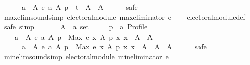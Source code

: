\begin{isabellebody}
\ \ \ \ \ \ {\isacharbraceleft}{\kern0pt}a\ {\isasymin}\ A{\isachardot}{\kern0pt}\ e\ a\ A\ p\ {\isasymle}\ t{\isacharbraceright}{\kern0pt}\ {\isasymunion}\ A\ {\isacharequal}{\kern0pt}\ A{\isachardoublequoteclose}\isanewline
\ \ \ \ \isamarkupfalse%
\ safe\isanewline
{}\isamarkupfalse%
%
\endisatagproof
{\isafoldproof}%
%
\isadelimproof
\isanewline
%
\endisadelimproof
\isanewline
{}\isamarkupfalse%
\ max{\isacharunderscore}{\kern0pt}elim{\isacharunderscore}{\kern0pt}sound{\isacharbrackleft}{\kern0pt}simp{\isacharbrackright}{\kern0pt}{\isacharcolon}{\kern0pt}\ {\isachardoublequoteopen}electoral{\isacharunderscore}{\kern0pt}module\ {\isacharparenleft}{\kern0pt}max{\isacharunderscore}{\kern0pt}eliminator\ e{\isacharparenright}{\kern0pt}{\isachardoublequoteclose}\isanewline
%
\isadelimproof
\ \ %
\endisadelimproof
%
\isatagproof
{}\isamarkupfalse%
\ electoral{\isacharunderscore}{\kern0pt}module{\isacharunderscore}{\kern0pt}def\isanewline
{}\isamarkupfalse%
\ {\isacharparenleft}{\kern0pt}safe{\isacharcomma}{\kern0pt}\ simp{\isacharparenright}{\kern0pt}\isanewline
\ \ \isamarkupfalse%
\isanewline
\ \ \ \ A\ {\isacharcolon}{\kern0pt}{\isacharcolon}{\kern0pt}\ {\isachardoublequoteopen}{\isacharprime}{\kern0pt}a\ set{\isachardoublequoteclose}\ \isanewline
\ \ \ \ p\ {\isacharcolon}{\kern0pt}{\isacharcolon}{\kern0pt}\ {\isachardoublequoteopen}{\isacharprime}{\kern0pt}a\ Profile{\isachardoublequoteclose}\isanewline
\ \ \isamarkupfalse%
\isanewline
\ \ \ \ {\isachardoublequoteopen}{\isacharbraceleft}{\kern0pt}a\ {\isasymin}\ A{\isachardot}{\kern0pt}\ e\ a\ A\ p\ {\isacharless}{\kern0pt}\ Max\ {\isacharbraceleft}{\kern0pt}e\ x\ A\ p\ {\isacharbar}{\kern0pt}x{\isachardot}{\kern0pt}\ x\ {\isasymin}\ A{\isacharbraceright}{\kern0pt}{\isacharbraceright}{\kern0pt}\ {\isasymnoteq}\ A\ {\isasymlongrightarrow}\isanewline
\ \ \ \ \ \ {\isacharbraceleft}{\kern0pt}a\ {\isasymin}\ A{\isachardot}{\kern0pt}\ e\ a\ A\ p\ {\isacharless}{\kern0pt}\ Max\ {\isacharbraceleft}{\kern0pt}e\ x\ A\ p\ {\isacharbar}{\kern0pt}x{\isachardot}{\kern0pt}\ x\ {\isasymin}\ A{\isacharbraceright}{\kern0pt}{\isacharbraceright}{\kern0pt}\ {\isasymunion}\ A\ {\isacharequal}{\kern0pt}\ A{\isachardoublequoteclose}\isanewline
\ \ \ \ \isamarkupfalse%
\ safe\isanewline
{}\isamarkupfalse%
%
\endisatagproof
{\isafoldproof}%
%
\isadelimproof
\isanewline
%
\endisadelimproof
\isanewline
{}\isamarkupfalse%
\ min{\isacharunderscore}{\kern0pt}elim{\isacharunderscore}{\kern0pt}sound{\isacharbrackleft}{\kern0pt}simp{\isacharbrackright}{\kern0pt}{\isacharcolon}{\kern0pt}\ {\isachardoublequoteopen}electoral{\isacharunderscore}{\kern0pt}module\ {\isacharparenleft}{\kern0pt}min{\isacharunderscore}{\kern0pt}eliminator\ e{\isacharparenright}{\kern0pt}{\isachardoublequoteclose}\isanewline

\end{isabellebody}
